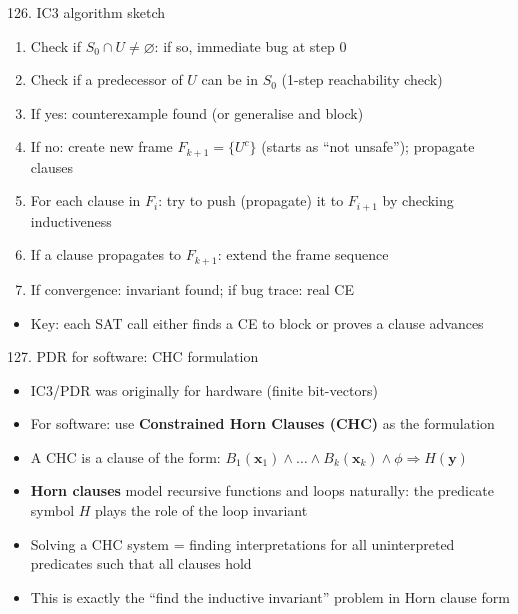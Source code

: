 \documentclass[aspectratio=169]{beamer}
\begin{document}
\begin{frame}{126. IC3 algorithm sketch}
\begin{enumerate}
  \item Check if \(S_0 \cap U \ne \varnothing\): if so, immediate bug at step 0
  \item Check if a predecessor of \(U\) can be in \(S_0\) (1-step reachability check)
  \item If yes: counterexample found (or generalise and block)
  \item If no: create new frame \(F_{k+1} = \{U^c\}\) (starts as ``not unsafe''); propagate clauses
  \item For each clause in \(F_i\): try to push (propagate) it to \(F_{i+1}\) by checking inductiveness
  \item If a clause propagates to \(F_{k+1}\): extend the frame sequence
  \item If convergence: invariant found; if bug trace: real CE
\end{enumerate}
\begin{itemize}
  \item Key: each SAT call either finds a CE to block or proves a clause advances
\end{itemize}
\end{frame}

\begin{frame}{127. PDR for software: CHC formulation}
\begin{itemize}
  \item IC3/PDR was originally for hardware (finite bit-vectors)
  \item For software: use \textbf{Constrained Horn Clauses (CHC)} as the formulation
  \item A CHC is a clause of the form: \(B_1(\mathbf{x}_1) \wedge \ldots \wedge B_k(\mathbf{x}_k) \wedge \phi \Rightarrow H(\mathbf{y})\)
  \item \textbf{Horn clauses} model recursive functions and loops naturally: the predicate symbol \(H\) plays the role of the loop invariant
  \item Solving a CHC system = finding interpretations for all uninterpreted predicates such that all clauses hold
  \item This is exactly the ``find the inductive invariant'' problem in Horn clause form
\end{itemize}
\end{frame}
\end{document}
